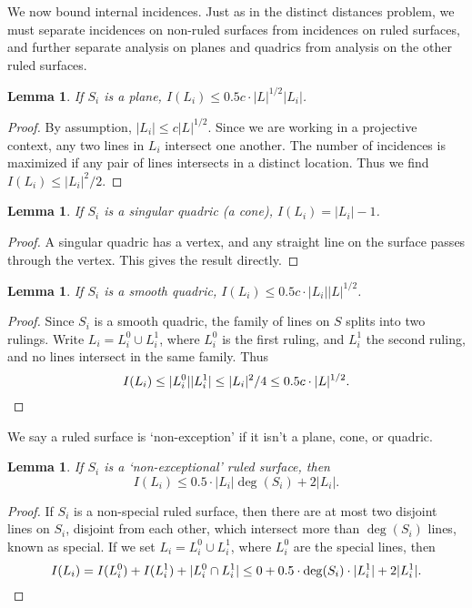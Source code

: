 \documentclass{article}
\theoremstyle{plain}
\newtheorem{lemma}[theorem]{Lemma}
\theoremstyle{remark}
\theoremstyle{definition}
\begin{document}
We now bound internal incidences. Just as in the distinct distances problem, we must separate incidences on non-ruled surfaces from incidences on ruled surfaces, and further separate analysis on planes and quadrics from analysis on the other ruled surfaces.

\begin{lemma}
    If $S_i$ is a plane, $I(L_i) \leq 0.5c \cdot |L|^{1/2} |L_i|$.
\end{lemma}
\begin{proof}
    By assumption, $|L_i| \leq c |L|^{1/2}$. Since we are working in a projective context, any two lines in $L_i$ intersect one another. The number of incidences is maximized if any pair of lines intersects in a distinct location. Thus we find $I(L_i) \leq |L_i|^2/2$.
\end{proof}

\begin{lemma}
    If $S_i$ is a singular quadric (a cone), $I(L_i) = |L_i| - 1$.
\end{lemma}
\begin{proof}
    A singular quadric has a vertex, and any straight line on the surface passes through the vertex. This gives the result directly.
\end{proof}

\begin{lemma}
    If $S_i$ is a smooth quadric, $I(L_i) \leq 0.5c \cdot |L_i| |L|^{1/2}$.
\end{lemma}
\begin{proof}
    Since $S_i$ is a smooth quadric, the family of lines on $S$ splits into two rulings. Write $L_i = L_i^0 \cup L_i^1$, where $L_i^0$ is the first ruling, and $L_i^1$ the second ruling, and no lines intersect in the same family. Thus
    \[ I(L_i) \leq |L_i^0| |L_i^1| \leq |L_i|^2/4 \leq 0.5c \cdot |L|^{1/2}. \qedhere \]
\end{proof}

We say a ruled surface is `non-exception' if it isn't a plane, cone, or quadric.

\begin{lemma}
    If $S_i$ is a `non-exceptional' ruled surface, then
    \[ I(L_i) \leq 0.5 \cdot |L_i| \deg(S_i) + 2 |L_i|. \]
\end{lemma}
\begin{proof}
    If $S_i$ is a non-special ruled surface, then there are at most two disjoint lines on $S_i$, disjoint from each other, which intersect more than $\deg(S_i)$ lines, known as special. If we set $L_i = L_i^0 \cup L_i^1$, where $L_i^0$ are the special lines, then
    \[ I(L_i) = I(L_i^0) + I(L_i^1) + |L_i^0 \cap L_i^1| \leq 0 + 0.5 \cdot \deg(S_i) \cdot |L_i^1| + 2|L_i^1|.\qedhere \]
\end{proof}
\end{document}
